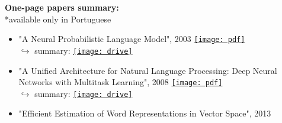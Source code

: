 \documentclass[
	a4paper,
]{fortysecondscv}
\begin{document}
\begin{minipage}[t]{0.53\linewidth}
\small
\textbf{\color{sectioncolor}One-page papers summary:}
\vspace{1.0mm}\\
\scriptsize
*available only in Portuguese

\newcommand{\drive}[1]{\href{#1}{\texttt{[image: drive]}}}
\newcommand{\pdf}[1]{\href{#1}{\hspace{1mm}\texttt{[image: pdf]}\\}}
\begin{itemize}[leftmargin=*,labelindent=3mm,labelsep=1mm]
    \item "A Neural Probabilistic Language Model", 2003
        \pdf{http://www.jmlr.org/papers/volume3/bengio03a/bengio03a.pdf}
        \hfill
        \hspace{2mm} $\hookrightarrow$ summary: 
            \hspace{0.1mm}
            \drive{https://docs.google.com/document/d/1MBboy05JIT-TyNyTxl-ppMgO-4PvaaaZrnW-M1L-0yI/edit?usp=sharing}
    \item "A Unified Architecture for Natural Language Processing: Deep Neural Networks with Multitask Learning", 2008
        \pdf{https://ronan.collobert.com/pub/matos/2008_nlp_icml.pdf}
        \hfill
        \hspace{2mm} $\hookrightarrow$ summary: 
            \hspace{0.1mm}
        \drive{https://docs.google.com/document/d/1jd6sd-SxfUYHUdh8hbLCDcR_PZ11d51tiEEHWcL3-zE/edit?usp=sharing} 
    \item "Efficient Estimation of Word Representations in Vector Space", 2013

\end{itemize}
\end{minipage}
\end{document}
